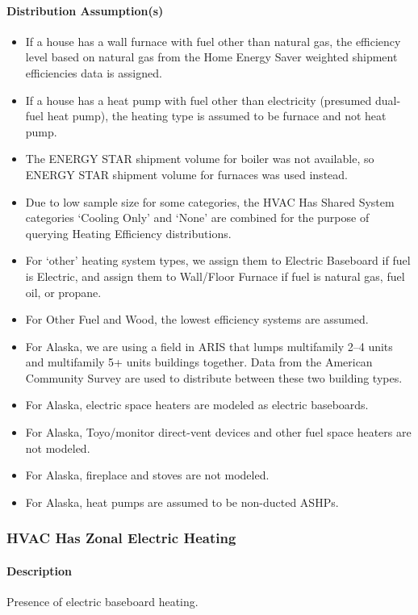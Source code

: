 \paragraph{Distribution Assumption(s)}
\begin{itemize}
    \item If a house has a wall furnace with fuel other than natural gas, the efficiency level based on natural gas from the Home Energy Saver weighted shipment efficiencies data is assigned.
    \item If a house has a heat pump with fuel other than electricity (presumed dual-fuel heat pump), the heating type is assumed to be furnace and not heat pump.
    \item The ENERGY STAR shipment volume for boiler was not available, so ENERGY STAR shipment volume for furnaces was used instead.
    \item Due to low sample size for some categories, the HVAC Has Shared System categories ‘Cooling Only’ and ‘None’ are combined for the purpose of querying Heating Efficiency distributions.
    \item For ‘other’ heating system types, we assign them to Electric Baseboard if fuel is Electric, and assign them to Wall/Floor Furnace if fuel is natural gas, fuel oil, or propane.
    \item For Other Fuel and Wood, the lowest efficiency systems are assumed.
    \item For Alaska, we are using a field in ARIS that lumps multifamily 2--4 units and multifamily 5+ units buildings together. Data from the American Community Survey are used to distribute between these two building types.
    \item For Alaska, electric space heaters are modeled as electric baseboards.
    \item For Alaska, Toyo/monitor direct-vent devices and other fuel space heaters are not modeled.
    \item For Alaska, fireplace and stoves are not modeled.
    \item For Alaska, heat pumps are assumed to be non-ducted ASHPs.
\end{itemize}
 
\subsubsection{HVAC Has Zonal Electric Heating}
\paragraph{Description}
Presence of electric baseboard heating.

